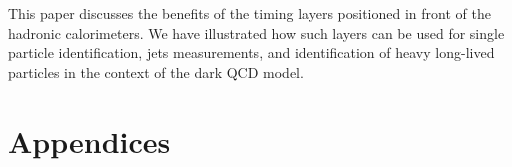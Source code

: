 \documentclass[final,1p,11pt]{elsarticle}
\begin{document}
This paper discusses the benefits of the timing layers positioned in front of the hadronic calorimeters.
We have illustrated how such layers can be used for single particle identification, jets measurements, and
identification of heavy long-lived particles in the context of the dark QCD model.

\newpage


\def\bibname{\Large\bf References}


\clearpage
\appendix
\renewcommand{\thesubsection}{\Alph{subsection}}
\section*{Appendices}

\end{document}
